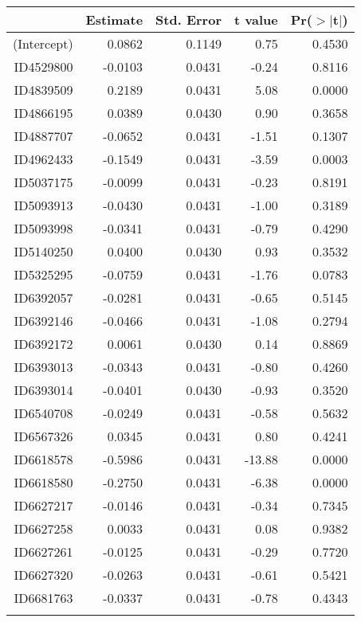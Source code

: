 \begin{table}[ht]
\centering
\begin{tabular}{rrrrr}
  \hline
 & Estimate & Std. Error & t value & Pr($>$$|$t$|$) \\ 
  \hline
(Intercept) & 0.0862 & 0.1149 & 0.75 & 0.4530 \\ 
  ID4529800 & -0.0103 & 0.0431 & -0.24 & 0.8116 \\ 
  ID4839509 & 0.2189 & 0.0431 & 5.08 & 0.0000 \\ 
  ID4866195 & 0.0389 & 0.0430 & 0.90 & 0.3658 \\ 
  ID4887707 & -0.0652 & 0.0431 & -1.51 & 0.1307 \\ 
  ID4962433 & -0.1549 & 0.0431 & -3.59 & 0.0003 \\ 
  ID5037175 & -0.0099 & 0.0431 & -0.23 & 0.8191 \\ 
  ID5093913 & -0.0430 & 0.0431 & -1.00 & 0.3189 \\ 
  ID5093998 & -0.0341 & 0.0431 & -0.79 & 0.4290 \\ 
  ID5140250 & 0.0400 & 0.0430 & 0.93 & 0.3532 \\ 
  ID5325295 & -0.0759 & 0.0431 & -1.76 & 0.0783 \\ 
  ID6392057 & -0.0281 & 0.0431 & -0.65 & 0.5145 \\ 
  ID6392146 & -0.0466 & 0.0431 & -1.08 & 0.2794 \\ 
  ID6392172 & 0.0061 & 0.0430 & 0.14 & 0.8869 \\ 
  ID6393013 & -0.0343 & 0.0431 & -0.80 & 0.4260 \\ 
  ID6393014 & -0.0401 & 0.0430 & -0.93 & 0.3520 \\ 
  ID6540708 & -0.0249 & 0.0431 & -0.58 & 0.5632 \\ 
  ID6567326 & 0.0345 & 0.0431 & 0.80 & 0.4241 \\ 
  ID6618578 & -0.5986 & 0.0431 & -13.88 & 0.0000 \\ 
  ID6618580 & -0.2750 & 0.0431 & -6.38 & 0.0000 \\ 
  ID6627217 & -0.0146 & 0.0431 & -0.34 & 0.7345 \\ 
  ID6627258 & 0.0033 & 0.0431 & 0.08 & 0.9382 \\ 
  ID6627261 & -0.0125 & 0.0431 & -0.29 & 0.7720 \\ 
  ID6627320 & -0.0263 & 0.0431 & -0.61 & 0.5421 \\ 
  ID6681763 & -0.0337 & 0.0431 & -0.78 & 0.4343 \\ 
$$
\end{tabular}
\end{table}
